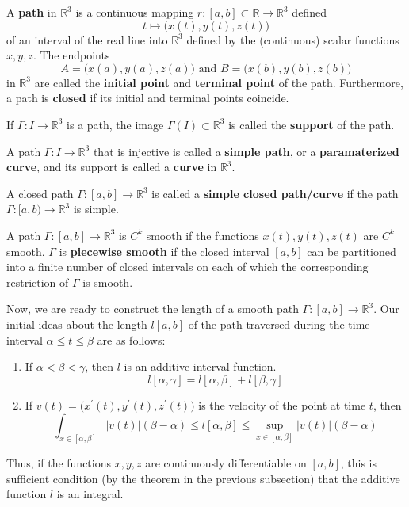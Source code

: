 \documentclass{article}
\begin{document}
      \begin{definition}[Path]
        A \textbf{path} in $\mathbb{R}^3$ is a continuous mapping $r: [a, b] \subset \mathbb{R} \longrightarrow \mathbb{R}^3$ defined
        \[t \mapsto \big(x(t), y(t), z(t)\big)\]
        of an interval of the real line into $\mathbb{R}^3$ defined by the (continuous) scalar functions $x, y, z$. The endpoints 
        \[A = \big(x(a), y(a), z(a)\big) \text{ and } B = \big(x(b), y(b), z(b)\big)\]
        in $\mathbb{R}^3$ are called the \textbf{initial point} and \textbf{terminal point} of the path. Furthermore, a path is \textbf{closed} if its initial and terminal points coincide. 
      \end{definition}

      \begin{definition}[Support]
        If $\Gamma: I \longrightarrow \mathbb{R}^3$ is a path, the image $\Gamma(I) \subset \mathbb{R}^3$ is called the \textbf{support} of the path. 
      \end{definition}

      \begin{definition}
        A path $\Gamma: I \longrightarrow \mathbb{R}^3$ that is injective is called a \textbf{simple path}, or a \textbf{paramaterized curve}, and its support is called a \textbf{curve} in $\mathbb{R}^3$. 

        A closed path $\Gamma: [a, b] \longrightarrow \mathbb{R}^3$ is called a \textbf{simple closed path/curve} if the path $\Gamma: [a, b) \longrightarrow \mathbb{R}^3$ is simple. 
      \end{definition}

      \begin{definition}
        A path $\Gamma: [a, b] \longrightarrow \mathbb{R}^3$ is $C^k$ smooth if the functions $x(t), y(t), z(t)$ are $C^k$ smooth. $\Gamma$ is \textbf{piecewise smooth} if the closed interval $[a, b]$ can be partitioned into a finite number of closed intervals on each of which the corresponding restriction of $\Gamma$ is smooth. 
      \end{definition}

      Now, we are ready to construct the length of a smooth path $\Gamma: [a, b] \longrightarrow \mathbb{R}^3$. Our initial ideas about the length $l[a, b]$ of the path traversed during the time interval $\alpha \leq t \leq \beta$ are as follows: 
      \begin{enumerate}
        \item If $\alpha < \beta < \gamma$, then $l$ is an additive interval function.
        \[l[\alpha, \gamma] = l[\alpha, \beta] + l[\beta, \gamma]\]
        \item If $v(t) = \big( x^\prime (t), y^\prime (t), z^\prime (t)\big)$ is the velocity of the point at time $t$, then 
        \[\int_{x \in [\alpha, \beta]} |v(t)| (\beta - \alpha) \leq l[\alpha, \beta] \leq \sup_{x \in [\alpha, \beta]} |v(t)| (\beta - \alpha)\]
      \end{enumerate}
      Thus, if the functions $x, y, z$ are continuously differentiable on $[a, b]$, this is sufficient condition (by the theorem in the previous subsection) that the additive function $l$ is an integral.
\end{document}
